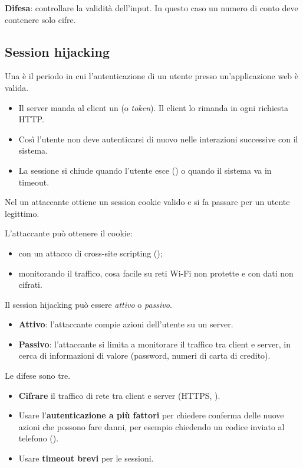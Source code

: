 \textbf{Difesa}: controllare la validità dell'input. In questo caso un numero di conto deve contenere solo cifre.

\subsection{Session hijacking}
\label{sec:sic-sessione}

Una  è il periodo in cui l'autenticazione di un utente presso un'applicazione web è valida.
\begin{itemize}
  \item Il server manda al client un  (o \emph{token}). Il client lo rimanda in ogni richiesta
    HTTP.
  \item Così l'utente non deve autenticarsi di nuovo nelle interazioni successive con il sistema.
  \item La sessione si chiude quando l'utente esce () o quando il sistema va in timeout.
\end{itemize}

\begin{definizione}
Nel  un attaccante ottiene un session cookie valido e si fa passare per un utente
legittimo.
\end{definizione}

L'attaccante può ottenere il cookie:
\begin{itemize}
  \item con un attacco di cross-site scripting ();
  \item monitorando il traffico, cosa facile su reti Wi-Fi non protette e con dati non cifrati.
\end{itemize}

Il session hijacking può essere \emph{attivo} o \emph{passivo}.
\begin{itemize}
  \item \textbf{Attivo}: l'attaccante compie azioni dell'utente su un server.
  \item \textbf{Passivo}: l'attaccante si limita a monitorare il traffico tra client e server, in cerca di informazioni
    di valore (password, numeri di carta di credito).
\end{itemize}

Le difese sono tre.
\begin{itemize}
  \item \textbf{Cifrare} il traffico di rete tra client e server (HTTPS, ).
  \item Usare l'\textbf{autenticazione a più fattori} per chiedere conferma delle nuove azioni che possono fare danni,
    per esempio chiedendo un codice inviato al telefono ().
  \item Usare \textbf{timeout brevi} per le sessioni.
\end{itemize}

